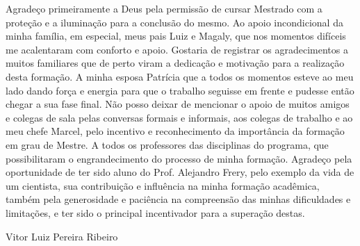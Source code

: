 \documentclass[tcc]{ic}
\begin{document}
\begin{agradecimentos}
% 

Agradeço primeiramente a Deus pela permissão de cursar Mestrado com a proteção e a iluminação para a conclusão do mesmo. Ao apoio incondicional da minha família, em especial, meus pais Luiz e Magaly, que nos momentos difíceis me acalentaram com conforto e apoio. Gostaria de registrar os agradecimentos a muitos familiares que de perto viram a dedicação e motivação para a realização desta formação. A minha esposa Patrícia que a todos os momentos esteve ao meu lado dando força e energia para que o trabalho seguisse em frente e pudesse então chegar a sua fase final. Não posso deixar de mencionar o apoio de muitos amigos e colegas de sala pelas conversas formais e informais, aos colegas de trabalho e ao meu chefe Marcel, pelo incentivo e reconhecimento da importância da formação em grau de Mestre. A todos os professores das disciplinas do programa, que possibilitaram o engrandecimento do processo de minha formação. Agradeço pela oportunidade de ter sido aluno do Prof. Alejandro Frery, pelo exemplo da vida de um cientista, sua contribuição e influência na minha formação acadêmica, também pela generosidade e paciência na compreensão das minhas dificuldades e limitações, e ter sido o principal incentivador para a superação destas.

% 
\begin{flushright}
Vitor Luiz Pereira Ribeiro
\end{flushright}
\end{agradecimentos}


\mylistoffigure

\mylistoftable
\end{document}
